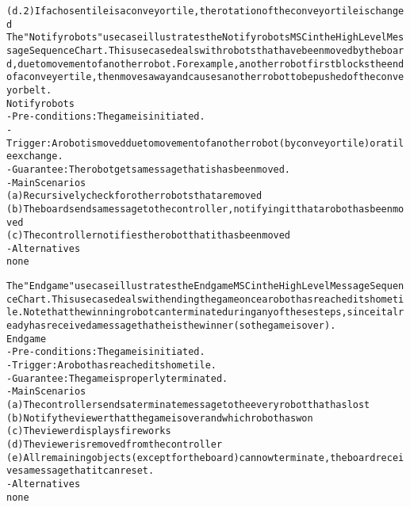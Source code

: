 \begin{alltt}
    (d.2) If a chosen tile is a conveyor tile, the rotation of the conveyor tile is changed \\

The "Notify robots" use case illustrates the Notify robots MSC in the High Level Message Sequence Chart. This use case deals with robots that have been moved by the board, due to movement of another robot. For example, another robot first blocks the end of a conveyer tile, then moves away and causes another robot to be pushed of the conveyor belt. \\

Notify robots
- Pre-conditions: The game is initiated.
- Trigger: A robot is moved due to movement of another robot (by conveyor tile) or a tile exchange.
- Guarantee: The robot gets a message that is has been moved.
- Main Scenarios
    (a) Recursively check for other robots that are moved
    (b) The board sends a message to the controller, notifying it that a robot has been moved
    (c) The controller notifies the robot that it has been moved
- Alternatives \\
    none

The "End game" use case illustrates the End game MSC in the High Level Message Sequence Chart. This use case deals with ending the game once a robot has reached its home tile. Note that the winning robot can terminate during any of these steps, since it already has received a message that he is the winner (so the game is over).\\

End game
- Pre-conditions: The game is initiated.
- Trigger:  A robot has reached its home tile.
- Guarantee: The game is properly terminated.
- Main Scenarios
    (a) The controller sends a terminate message to the every robot that has lost
    (b) Notify the viewer that the game is over and which robot has won
    (c) The viewer displays fireworks
    (d) The viewer is removed from the controller
    (e) All remaining objects (except for the board) can now terminate, the board receives a message that it can reset.
- Alternatives
    none 

\end{alltt}
